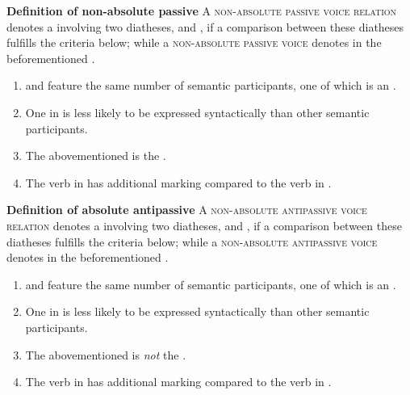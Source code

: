\smallskip

\noindent
\begin{center}
	\begin{minipage}{0.80\textwidth}
		\textbf{Definition of non-absolute passive} \newline
		A \textsc{non-absolute passive voice relation} denotes a  involving two diatheses,  and , if a comparison between these diatheses fulfills the criteria below; while a \textsc{non-absolute passive voice} denotes  in the beforementioned .
		\begin{enumerate}[label=\roman*)]
			\item {} and  feature the same number of semantic participants, one of which is an .
			\item One  in  is less likely to be expressed syntactically than other semantic participants.
			\item The abovementioned  is the .
			\item The verb in  has additional marking compared to the verb in .
		\end{enumerate}
	\end{minipage}
\end{center}

\noindent
\begin{center}
	\begin{minipage}{0.80\textwidth}
		\textbf{Definition of absolute antipassive} \newline
		A \textsc{non-absolute antipassive voice relation} denotes a  involving two diatheses,  and , if a comparison between these diatheses fulfills the criteria below; while a \textsc{non-absolute antipassive voice} denotes  in the beforementioned .
		\begin{enumerate}[label=\roman*)]
			\item {} and  feature the same number of semantic participants, one of which is an .
			\item One  in  is less likely to be expressed syntactically than other semantic participants.
			\item The abovementioned  is \textit{not} the .
			\item The verb in  has additional marking compared to the verb in .
		\end{enumerate}
	\end{minipage}
\end{center}


